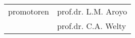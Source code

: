 \thispagestyle{empty}

\begin{addmargin}[-3cm]{1cm}

\begin{flushleft}
\begin{tabular}{l l}
promotoren & prof.dr. L.M. Aroyo\\
& prof.dr. C.A. Welty\\
\end{tabular}
\end{flushleft}

\end{addmargin}